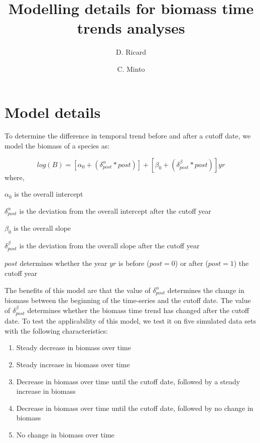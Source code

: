 \documentclass[letterpaper,12pt]{article}
\title{Modelling details for biomass time trends analyses}
\author{D. Ricard \and C. Minto}
\begin{document}
\maketitle



\section{Model details}
To determine the difference in temporal trend before and after a cutoff date, we model the biomass of a species as:

\begin{equation}
log\left(B\right) = \left[ \alpha_{0} + \left(\delta_{post}^{\alpha} * post\right)\right] + \left[ \beta_{0} + \left(\delta_{post}^{\beta} * post\right) \right]yr
\end{equation}
where,
\begin{description}
\item{$\alpha_{0}$} is the overall intercept
\item{$\delta_{post}^{\alpha}$} is the deviation from the overall intercept after the cutoff year
\item{$\beta_{0}$} is the overall slope
\item{$\delta_{post}^{\beta}$} is the deviation from the overall slope after the cutoff year
\item{$post$} determines whether the year $yr$ is before ($post=0$) or after ($post=1$) the cutoff year
\end{description}

The benefits of this model are that the value of $\delta_{post}^{\alpha}$ determines the change in biomass between the beginning of the time-series and the cutoff date. The value of $\delta_{post}^{\beta}$ determines whether the biomass time trend has changed after the cutoff date. To test the applicability of this model, we test it on five simulated data sets with the following characteristics:

\begin{enumerate}
\item{Steady decrease in biomass over time}
\item{Steady increase in biomass over time}
\item{Decrease in biomass over time until the cutoff date, followed by a steady increase in biomass}
\item{Decrease in biomass over time until the cutoff date, followed by no change in biomass}
\item{No change in biomass over time}
\end{enumerate}
\end{document}
